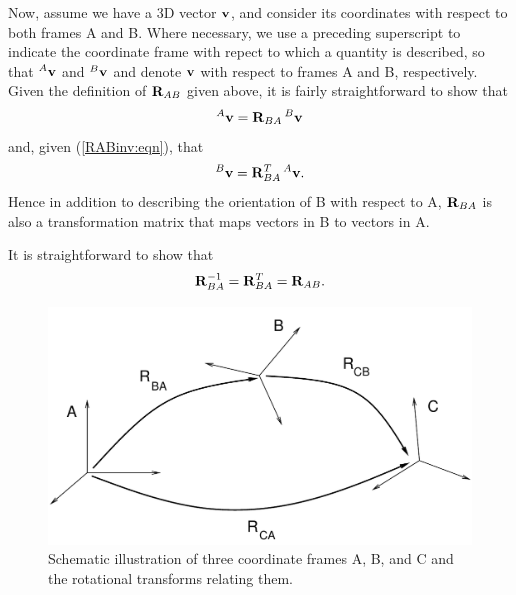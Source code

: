 Now, assume we have a 3D vector ${\bf v}$, and consider its coordinates
with respect to both frames A and B.  Where necessary, we use a
preceding superscript to indicate the coordinate frame with repect to
which a quantity is described, so that ${}^A{\bf v}$ and ${}^B{\bf v}$ and
denote ${\bf v}$ with respect to frames A and B, respectively.  Given the
definition of ${\bf R}_{AB}$ given above, it is fairly straightforward to
show that
%
\begin{equation}
{}^A{\bf v} = {\bf R}_{BA} \, {}^B{\bf v}
\label{vectorTransform:eqn}
\end{equation}
%
and, given (\ref{RABinv:eqn}), that
%
\begin{equation}
{}^B{\bf v} = {\bf R}_{BA}^T \, {}^A{\bf v}.
\label{vectorInvTransform:eqn}
\end{equation}
%
Hence in addition to describing the orientation of B with respect to A,
${\bf R}_{BA}$ is also a transformation matrix that maps vectors in B
to vectors in A.

It is straightforward to show that
%
\begin{equation}
{\bf R}_{BA}^{-1} = {\bf R}_{BA}^T = {\bf R}_{AB}.
\label{rotationInverse:eqn}
\end{equation}
%

\begin{figure}[t]
\begin{center}
 \includegraphics[width=4.5in]{images/rotationsABC}
\end{center}
\caption{Schematic illustration of three coordinate frames A, B, and C
and the rotational transforms relating them.}
\label{rotationsABC:fig}
\end{figure}

